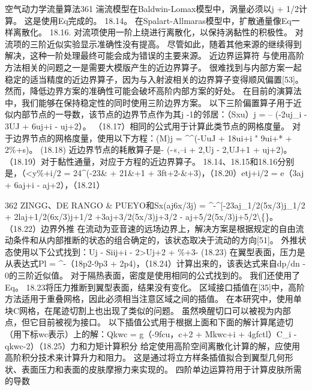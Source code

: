 \documentclass[UTF8,11pt,a4paper,openany,fontset=fandol]{ctexbook}
\begin{document}
空气动力学流量算法361 湍流模型在Baldwin-Lomax模型中，涡量必须以j + 1/2计算。 这是使用Eq完成的。 18.14。 在Spalart-Allmaras模型中，扩散通量像Eq一样离散化。 18.16. 对流项使用一阶上绕进行离散化，以保持涡黏性的积极性。 对流项的三阶近似实验显示准确性没有提高。 尽管如此，随着其他来源的继续得到解决，这种一阶处理最终可能会成为错误的主要来源。 近边界运算符 与使用高阶方法相关的问题之一是需要大模版产生的近边界算子。 很难找到与内部方案一起稳定的适当精度的近边界算子，因为与入射波相关的边界算子变得顺风偏置[53]。 然而，降低边界方案的准确性可能会破坏高阶内部方案的好处。 在目前的演算法中，我们能够在保持稳定性的同时使用三阶边界方案。 以下三阶偏置算子用于近似内部节点的一导数，该节点的边界节点作为其j -1的邻居：（Sxu）j = -- (-2uj\_i - 3UJ + 6uj+i - uj+2）。 （18.17）相同的公式用于计算此类节点的网格度量。 对于边界节点的网格度量，使用以下方程：(M)j = \textasciicircum{}\textasciicircum{}(-UuJ + 18ui+i " 9ui+* + 2\%+s)。 (18.18) 近边界节点的耗散算子是- (-«,--i + 2,Uj - 2,UJ+1 + uj+2)。 （18.19）对于黏性通量，对应于方程的近边界算子。 18.14、18.15和18.16分别是，（<y\%+i/2 = 24\textasciicircum{}(-23\& + 21\&+1 + 3ft+2-\&+3)，（18.20）etj+i/2 = e（3aj + 6aj+i - aj+2），（18.21）

362 ZINGG、DE RANGO \& PUEYO和Sx(aj6x/3j) = \textasciicircum{}-\textasciicircum{}[-23aj\_1/2(5x/3)j\_1/2 + 2laj+1/2(6x/3)j+1/2 +3aj+3/2(5x/3)j+3/2 - aj+5/2(5x/3)j+5/2\textbackslash\{\}。 （18.22）边界外推 在流动为亚音速的远场边界上，解决方案是根据规定的自由流动条件和从内部推断的状态的组合确定的，该状态取决于流动的方向[51]。 外推状态使用以下公式找到：Uj - Siij+i - 2>Uj+2 + \%+3- (18.23) 在翼型表面，压力是从表达式Pl = \textasciicircum{}-（18p2-9p3 + 2p4)，（18.24）计算出来的，该表达式来自dp/dn - 0的三阶近似值。 对于隔热表面，密度是使用相同的公式找到的。 我们还使用了Eq。 18.23将压力推断到翼型表面，结果没有变化。 区域接口插值在[35]中，高阶方法适用于重叠网格，因此必须相当注意区域之间的插值。 在本研究中，使用单块C网格，在尾迹切割上也出现了类似的问题。 虽然唤醒切口可以被视为内部点，但它目前被视为接口。 以下插值公式用于根据上面和下面的解计算尾迹切（用下标wc表示）上的解：Qkwc = g（-9fcu，c+2 + Mkwc+i + 4gfctl）C\_i - qkwc-2）（18.25）力和力矩计算积分 给定使用高阶空间离散化计算的解，应使用高阶积分技术来计算升力和阻力。 这是通过将立方样条插值拟合到翼型几何形状、表面压力和表面的皮肤摩擦力来实现的。 四阶单边运算符用于计算皮肤所需的导数
\end{document}
